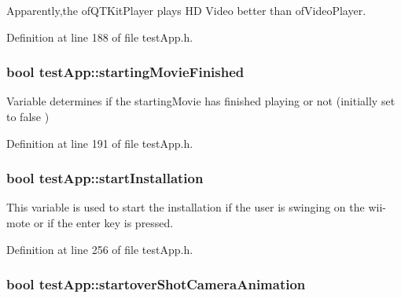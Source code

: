 Apparently,the of\-Q\-T\-Kit\-Player plays H\-D Video better than of\-Video\-Player. 



Definition at line 188 of file test\-App.\-h.

\hypertarget{classtest_app_aea3cb9f5f0061a42a4953d6b6c949036}{
\subsubsection[{starting\-Movie\-Finished}]{\setlength{\rightskip}{0pt plus 5cm}bool test\-App\-::starting\-Movie\-Finished}}\label{classtest_app_aea3cb9f5f0061a42a4953d6b6c949036}


Variable determines if the starting\-Movie has finished playing or not (initially set to false ) 



Definition at line 191 of file test\-App.\-h.

\hypertarget{classtest_app_a8a65a6d1a473417cec1c2ac2e6116aae}{
\subsubsection[{start\-Installation}]{\setlength{\rightskip}{0pt plus 5cm}bool test\-App\-::start\-Installation}}\label{classtest_app_a8a65a6d1a473417cec1c2ac2e6116aae}


This variable is used to start the installation if the user is swinging on the wii-\/mote or if the enter key is pressed. 



Definition at line 256 of file test\-App.\-h.

\hypertarget{classtest_app_ad2fca6ce5e37462cd820afc48633324d}{
\subsubsection[{startover\-Shot\-Camera\-Animation}]{\setlength{\rightskip}{0pt plus 5cm}bool test\-App\-::startover\-Shot\-Camera\-Animation}}\label{classtest_app_ad2fca6ce5e37462cd820afc48633324d}


